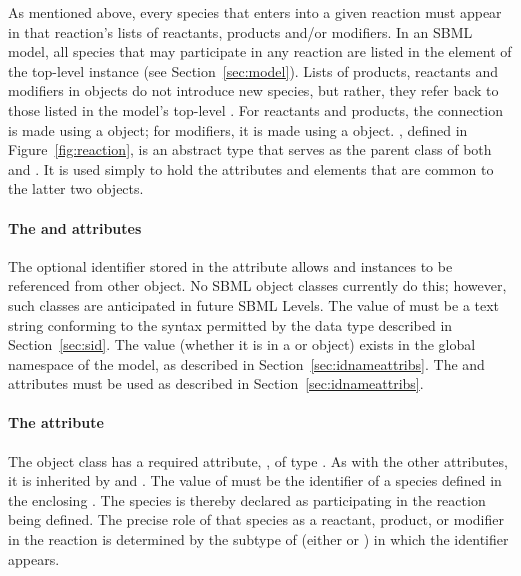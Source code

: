 As mentioned above, every species that enters into a given
reaction must appear in that reaction's lists of reactants,
products and/or modifiers.  In an SBML model, all species that may
participate in any reaction are listed in the
 element of the top-level \Model instance
(see Section~\ref{sec:model}).  Lists of products, reactants and
modifiers in \Reaction objects do not introduce new species,
but rather, they refer back to those listed in the model's
top-level .  For reactants and products, the
connection is made using a \SpeciesReference object; for
modifiers, it is made using a \ModifierSpeciesReference 
object.  \SimpleSpeciesReference, defined in
Figure~\vref{fig:reaction}, is an abstract type that serves as the
parent class of both \SpeciesReference and
\ModifierSpeciesReference.  It is used simply to hold the attributes
and elements that are common to the latter two objects.


\paragraph{The  and  attributes}

The optional identifier stored in the  attribute allows
\SpeciesReference and \ModifierSpeciesReference instances to be
referenced from other object.  No SBML object classes currently do
this; however, such classes are anticipated in future SBML
Levels.  The value of  must be a text string conforming
to the syntax permitted by the  data type described
in Section~\ref{sec:sid}.  The  value (whether it is in
a \SpeciesReference or \ModifierSpeciesReference object) exists in
the global namespace of the model, as described in
Section~\ref{sec:idnameattribs}.  The  and 
attributes must be used as described in
Section~\ref{sec:idnameattribs}.


\paragraph{The  attribute}

The \SimpleSpeciesReference object class has a required attribute,
, of type .  As with the other
attributes, it is inherited by \SpeciesReference and
\ModifierSpeciesReference.  The value of  must be the
identifier of a species defined in the enclosing \Model.  The
species is thereby declared as participating in the reaction being
defined.  The precise role of that species as a reactant, product,
or modifier in the reaction is determined by the subtype of
\SimpleSpeciesReference (\ie either \SpeciesReference or
\ModifierSpeciesReference) in which the identifier appears.


